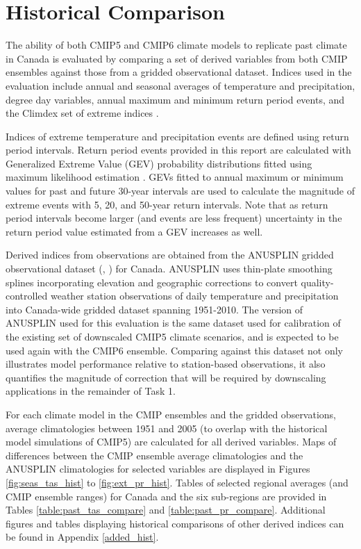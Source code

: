 \documentclass[]{scrartcl}
\begin{document}
\section{Historical Comparison}

The ability of both CMIP5 and CMIP6 climate models to replicate past climate in Canada is evaluated by comparing a set of derived variables from both CMIP ensembles against those from a gridded observational dataset. Indices used in the evaluation include annual and seasonal averages of temperature and precipitation, degree day variables, annual maximum and minimum return period events, and the Climdex set of extreme indices \citep{Zhang2011}. 

Indices of extreme temperature and precipitation events are defined using return period intervals. Return period events provided in this report are calculated with Generalized Extreme Value (GEV) probability distributions fitted using maximum likelihood estimation \citep{Coles2001}. GEVs fitted to annual maximum or minimum values for past and future 30-year intervals are used to calculate the magnitude of extreme events with 5, 20, and 50-year return intervals. Note that as return period intervals become larger (and events are less frequent) uncertainty in the return period value estimated from a GEV increases as well. 

Derived indices from observations are obtained from the ANUSPLIN gridded observational dataset (\citealt{Hopkinson2012}, \citealt{McKenney2011}) for Canada. ANUSPLIN uses thin-plate smoothing splines incorporating elevation and geographic corrections to convert quality-controlled weather station observations of daily temperature and precipitation into Canada-wide gridded dataset spanning 1951-2010. The version of ANUSPLIN used for this evaluation is the same dataset used for calibration of the existing set of downscaled CMIP5 climate scenarios, and is expected to be used again with the CMIP6 ensemble. Comparing against this dataset not only illustrates model performance relative to station-based observations, it also quantifies the magnitude of correction that will be required by downscaling applications in the remainder of Task 1.

For each climate model in the CMIP ensembles and the gridded observations, average climatologies between 1951 and 2005 (to overlap with the historical model simulations of CMIP5) are calculated for all derived variables. Maps of differences between the CMIP ensemble average climatologies and the ANUSPLIN climatologies for selected variables are displayed in Figures \ref{fig:seas_tas_hist} to \ref{fig:ext_pr_hist}. Tables of selected regional averages (and CMIP ensemble ranges) for Canada and the six sub-regions are provided in Tables \ref{table:past_tas_compare} and \ref{table:past_pr_compare}. Additional figures and tables displaying historical comparisons of other derived indices can be found in Appendix \ref{added_hist}.
\end{document}
